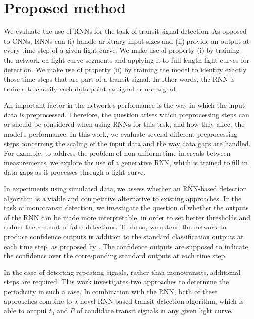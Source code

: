 
\section{Proposed method}
\label{sec:proposed}

We evaluate the use of RNNs for the task of transit signal detection. As opposed to CNNs, RNNs can (i) handle arbitrary input sizes and (ii) provide an output at every time step of a given light curve. We make use of property (i) by training the network on light curve segments and applying it to full-length light curves for detection. We make use of property (ii) by training the model to identify exactly those time steps that are part of a transit signal. In other words, the RNN is trained to classify each data point as signal or non-signal.

An important factor in the network's performance is the way in which the input data is preprocessed. Therefore, the question arises which preprocessing steps can or should be considered when using RNNs for this task, and how they affect the model’s performance. In this work, we evaluate several different preprocessing steps concerning the scaling of the input data and the way data gaps are handled. For example, to address the problem of non-uniform time intervals between measurements, we explore the use of a generative RNN, which is trained to fill in data gaps as it processes through a light curve. 

In experiments using simulated data, we assess whether an RNN-based detection algorithm is a viable and competitive alternative to existing approaches. In the task of monotransit detection, we investigate the question of whether the outputs of the RNN can be made more interpretable, in order to set better thresholds and reduce the amount of false detections. 
To do so, we extend the network to produce confidence outputs in addition to the standard classification outputs at each time step, as proposed by \cite{devries2018learning}. 
The confidence outputs are supposed to indicate the confidence over the corresponding standard outputs at each time step.

In the case of detecting repeating signals, rather than monotransits, additional steps are required. This work investigates two approaches to determine the periodicity in such a case. In combination with the RNN, both of these approaches combine to a novel RNN-based transit detection algorithm, which is able to output $t_0$ and $P$ of candidate transit signals in any given light curve.

